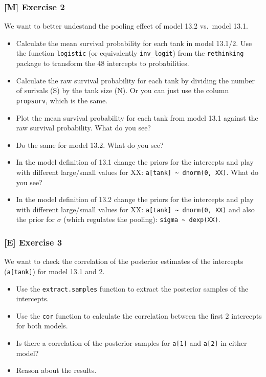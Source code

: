 \documentclass[
]{article}
\providecommand{\tightlist}{%
  \setlength{\itemsep}{0pt}\setlength{\parskip}{0pt}}
\begin{document}
\subsubsection{{[}M{]} Exercise 2}\label{exercise2_LMM}

We want to better undestand the pooling effect of model 13.2 vs.~model
13.1.

\begin{itemize}
\tightlist
\item
  Calculate the mean survival probability for each tank in model 13.1/2.
  Use the function \texttt{logistic} (or equivalently
  \texttt{inv\_logit}) from the \texttt{rethinking} package to transform
  the \(48\) intercepts to probabilities.
\item
  Calculate the raw survival probability for each tank by dividing the
  number of surivals (S) by the tank size (N). Or you can just use the
  column \texttt{propsurv}, which is the same.
\item
  Plot the mean survival probability for each tank from model 13.1
  against the raw survival probability. What do you see?
\item
  Do the same for model 13.2. What do you see?
\item
  In the model definition of 13.1 change the priors for the intercepts
  and play with different large/small values for XX:
  \texttt{a{[}tank{]}\ \textasciitilde{}\ dnorm(0,\ XX)}. What do you
  see?
\item
  In the model definition of 13.2 change the priors for the intercepts
  and play with different large/small values for XX:
  \texttt{a{[}tank{]}\ \textasciitilde{}\ dnorm(0,\ XX)} and also the
  prior for \(\sigma\) (which regulates the pooling):
  \texttt{sigma\ \textasciitilde{}\ dexp(XX)}.
\end{itemize}

\subsubsection{{[}E{]} Exercise 3}\label{exercise3_LMM}

We want to check the correlation of the posterior estimates of the
intercepts (\texttt{a{[}tank{]}}) for model 13.1 and 2.

\begin{itemize}
\tightlist
\item
  Use the \texttt{extract.samples} function to extract the posterior
  samples of the intercepts.
\item
  Use the \texttt{cor} function to calculate the correlation between the
  first \(2\) intercepts for both models.
\item
  Is there a correlation of the posterior samples for \texttt{a{[}1{]}}
  and \texttt{a{[}2{]}} in either model?
\item
  Reason about the results.
\end{itemize}
\end{document}
